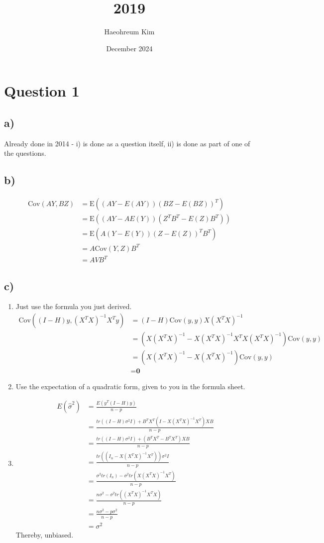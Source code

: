 \documentclass{article}
\title{2019}
\author{Haeohreum Kim}
\date{December 2024}
\begin{document}
\maketitle
\section*{Question 1}
\subsection*{a)}
Already done in 2014 - i) is done as a question itself, ii) is done as part of one of the questions.
\subsection*{b)}
\begin{align*}
    \text{Cov}(AY, BZ) &= \text{E}((AY - E(AY))(BZ - E(BZ))^T) \\ 
    &= \text{E}((AY - AE(Y))(Z^TB^T - E(Z)B^T)) \\ 
    &= \text{E}(A(Y-E(Y))(Z - E(Z))^TB^T) \\ 
    &= A\text{Cov}(Y, Z)B^T \\ 
    &= AVB^T
\end{align*}

\subsection*{c)}
\begin{enumerate}
    \item Just use the formula you just derived.
    \begin{align*}
        \text{Cov}((I-H)y, (X^TX)^{-1}X^Ty) &= (I-H)\text{Cov}(y, y)X(X^TX)^{-1} \\ 
        &= (X(X^TX)^{-1} - X(X^TX)^{-1}X^TX(X^TX)^{-1})\text{Cov}(y, y) \\ 
        &= (X(X^TX)^{-1} - X(X^TX)^{-1})\text{Cov}(y, y) \\ 
        &= \textbf{0}
    \end{align*}
    \item Use the expectation of a quadratic form, given to you in the formula sheet.
    \item \begin{align*}
        E(\hat{\sigma}^2) &= \frac{E(y^T(I - H)y)}{n - p} \\ 
        &= \frac{tr((I - H)\sigma^2I) + B^TX^T(I - X(X^TX)^{-1}X^T)XB}{n - p} \\ 
        &= \frac{tr((I - H)\sigma^2I) + (B^TX^T - B^TX^T)XB}{n - p} \\
        &= \frac{tr((I_n - X(X^TX)^{-1}X^T))\sigma^2I}{n - p} \\ 
        &= \frac{\sigma^2tr(I_n) - \sigma^2tr(X(X^TX)^{-1}X^T)}{n - p} \\ 
        &= \frac{n\sigma^2 - \sigma^2tr((X^TX)^{-1}X^TX)}{n - p} \\ 
        &= \frac{n\sigma^2 - p\sigma^2}{n- p} \\
        &= \sigma^2
    \end{align*}
    Thereby, unbiased.
\end{enumerate}
\end{document}
